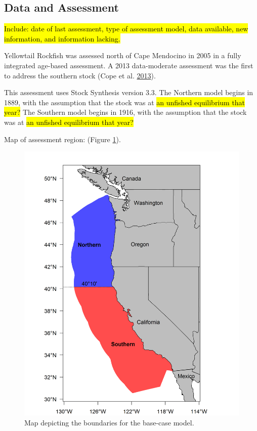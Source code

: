 \documentclass[12pt,]{article}
\begin{document}
\FloatBarrier

\newpage

\subsection*{Data and Assessment}\label{data-and-assessment}

\hl{Include: date of last assessment, type of assessment model, data available, new 
information, and information lacking.}

Yellowtail Rockfish was assessed north of Cape Mendocino in 2005 in a
fully integrated age-based assessment. A 2013 data-moderate assessment
was the first to address the southern stock (Cope et al.
\protect\hyperlink{ref-Cope2013}{2013}).

This assessment uses Stock Synthesis version 3.3. The Northern model
begins in 1889, with the assumption that the stock was at
\hl{an unfished equilibrium that year?} The Southern model begins in
1916, with the assumption that the stock was at
\hl{an unfished equilibrium that year?}

Map of assessment region: (Figure \ref{fig:assess_region_map_Exec_Sum}).

\begin{figure}[htbp]
\centering
\includegraphics{Figures/assess_region_map_v2.png}
\caption{Map depicting the boundaries for the base-case model.
\label{fig:assess_region_map_Exec_Sum}}
\end{figure}
\end{document}
